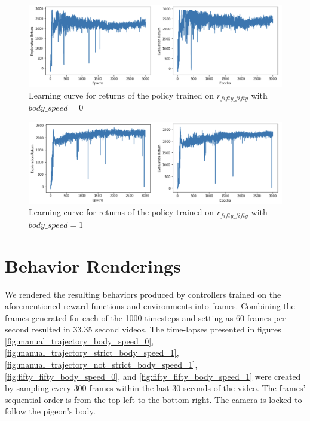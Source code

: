   \begin{figure}[H]
      \centering
      \includegraphics[width=1\textwidth]{figures/learning_curves/fifty_fifty_bs_0.png}
      \caption{Learning curve for returns of the policy trained on $r_{fifty\_fifty}$ with $body\_speed = 0$}
      \label{fig:learning_rate_fifty_fifty_bs_0}
  \end{figure}

  \begin{figure}[H]
      \centering
      \includegraphics[width=1\textwidth]{figures/learning_curves/fifty_fifty_bs_1.png}
      \caption{Learning curve for returns of the policy trained on $r_{fifty\_fifty}$ with $body\_speed = 1$}
      \label{fig:learning_rate_fifty_fifty_bs_1}
  \end{figure}



\section{Behavior Renderings}
  We rendered the resulting behaviors produced by controllers trained on the aforementioned reward functions and environments into frames.
  Combining the frames generated for each of the 1000 timesteps and setting as 60 frames per second resulted in 33.35 second videos.
  The time-lapses presented in figures \ref{fig:manual_trajectory_body_speed_0}, \ref{fig:manual_trajectory_strict_body_speed_1}, \ref{fig:manual_trajectory_not_strict_body_speed_1}, \ref{fig:fifty_fifty_body_speed_0}, and \ref{fig:fifty_fifty_body_speed_1} were created by sampling every $300$ frames within the last 30 seconds of the video.
  The frames' sequential order is from the top left to the bottom right.
  The camera is locked to follow the pigeon's body.

